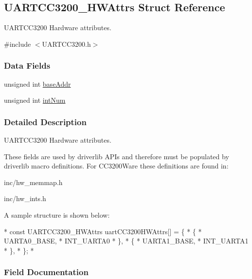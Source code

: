 \subsection{U\-A\-R\-T\-C\-C3200\-\_\-\-H\-W\-Attrs Struct Reference}
\label{struct_u_a_r_t_c_c3200___h_w_attrs}


U\-A\-R\-T\-C\-C3200 Hardware attributes.  




{\ttfamily \#include $<$U\-A\-R\-T\-C\-C3200.\-h$>$}

\subsubsection*{Data Fields}
\begin{DoxyCompactItemize}
\item 
unsigned int \hyperlink{struct_u_a_r_t_c_c3200___h_w_attrs_a559d6e21a7f9950e0d3e9d42413d47ea}{base\-Addr}
\item 
unsigned int \hyperlink{struct_u_a_r_t_c_c3200___h_w_attrs_a45e245f429f6bba9b77223bdcd58f2a2}{int\-Num}
\end{DoxyCompactItemize}


\subsubsection{Detailed Description}
U\-A\-R\-T\-C\-C3200 Hardware attributes. 

These fields are used by driverlib A\-P\-Is and therefore must be populated by driverlib macro definitions. For C\-C3200\-Ware these definitions are found in\-:
\begin{DoxyItemize}
\item inc/hw\-\_\-memmap.\-h
\item inc/hw\-\_\-ints.\-h
\end{DoxyItemize}

A sample structure is shown below\-: 
\begin{DoxyCode}
*  \textcolor{keyword}{const} UARTCC3200_HWAttrs uartCC3200HWAttrs[] = \{
*      \{
*          UARTA0\_BASE,
*          INT\_UARTA0
*      \},
*      \{
*          UARTA1\_BASE,
*          INT\_UARTA1
*      \},
*  \};
*  
\end{DoxyCode}
 

\subsubsection{Field Documentation}
